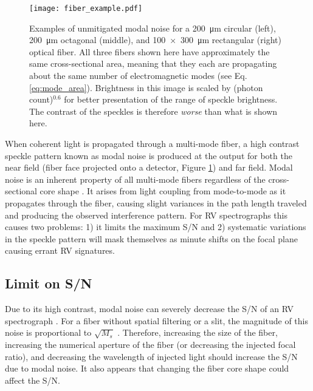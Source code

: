 \documentclass[twocolumn]{emulateapj}
\begin{document}
\begin{figure}
\centering
	\texttt{[image: fiber\_example.pdf]}
	\caption{Examples of unmitigated modal noise for a \SI{200}{\micro\meter} circular (left), \SI{200}{\micro\meter} octagonal (middle), and \SI{100x300}{\micro\meter} rectangular (right) optical fiber. All three fibers shown here have approximately the same cross-sectional area, meaning that they each are propagating about the same number of electromagnetic modes (see Eq. \ref{eq:mode_area}). Brightness in this image is scaled by (photon count)$^{0.6}$ for better presentation of the range of speckle brightness. The contrast of the speckles is therefore \textit{worse} than what is shown here.}
\label{fig:fiber_example}
\end{figure}

When coherent light is propagated through a multi-mode fiber, a high contrast speckle pattern known as modal noise is produced at the output for both the near field (fiber face projected onto a detector, Figure \ref{fig:fiber_example}) and far field. Modal noise is an inherent property of all multi-mode fibers regardless of the cross-sectional core shape \citep{Sablowski2015}. It arises from light coupling from mode-to-mode as it propagates through the fiber, causing slight variances in the path length traveled and producing the observed interference pattern. For RV spectrographs this causes two problems: 1) it limits the maximum S/N and 2) systematic variations in the speckle pattern will mask themselves as minute shifts on the focal plane causing errant RV signatures.

\subsection{Limit on S/N}

Due to its high contrast, modal noise can severely decrease the S/N of an RV spectrograph \citep{Epworth1978, Baudrand2001, Lemke2011, Iuzzolino2014}. For a fiber without spatial filtering or a slit, the magnitude of this noise is proportional to $\sqrt{M_s}$ \citep{Goodman1981}. Therefore, increasing the size of the fiber, increasing the numerical aperture of the fiber (or decreasing the injected focal ratio), and decreasing the wavelength of injected light should increase the S/N due to modal noise. It also appears that changing the fiber core shape could affect the S/N.
\end{document}
